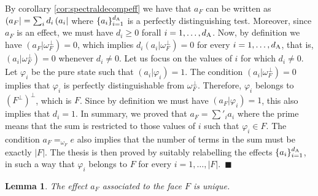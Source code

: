 \documentclass[12pt,aps,pra,showpacs,groupedaddress]{revtex4-1}
\newtheorem{lemma}{Lemma} \newtheorem{proposition}{Proposition}
\def\Proof{\medskip\par\noindent{\bf Proof. }}
\def\qed{$\,\blacksquare$\par}
\def\SC#1#2{\left(#1\right|\left.\!#2\right)}  \def\Tr{{\rm Tr}}
\begin{document}
\Proof By corollary \ref{cor:spectraldecompeff} we have that $a_F$ can
be written as $\left(a_F\right| = \sum_i d_i \left( a_i\right|$ where
$\{a_i\}_{i=1}^{d_{\rm A}}$ is a perfectly distinguishing test.  Moreover,
since $a_F$ is an effect, we must have $d_i\ge 0 $ forall $i=1, \dots,
d_{\rm A}$.  Now, by definition we have $\SC {a_F}{\omega_F^\perp} =0$,
which implies $d_i \SC {a_i} {\omega_F^\perp} = 0$ for every $i=1,
\dots, d_{\rm A}$, that is, $\SC {a_i}{\omega_F^\perp} = 0$ whenever $d_i
\not = 0$.  Let us focus on the values of $i$ for which $d_i \not =
0$. Let $\varphi_i$ be the pure state such that $\SC {a_i}{\varphi_i}
= 1$.  The condition $\SC {a_i}{\omega_F^\perp} = 0$ implies that
$\varphi_i$ is perfectly distinguishable from $\omega_F^\perp$.
Therefore, $\varphi_i$ belongs to $(F^\perp)^\perp$, which is $F$.
Since by definition we must have $\SC {a_F}{\varphi_i} = 1$, this also
implies that $d_i = 1$.  In summary, we proved that $a_F = \sum'_i
a_i$ where the prime means that the sum is restricted to those values
of $i$ such that $\varphi_i \in F$.  The condition $a_F =_{\omega_F}
e$ also implies that the number of terms in the sum must be exactly
$|F|$.  The thesis is then proved by suitably relabelling the effects
$\{a_i\}_{i=1}^{d_{\rm A}}$, in such a way that $\varphi_i $ belongs to
$F$ for every $i=1, \dots, |F|$.  \qed


\begin{lemma}\label{lem:uniqueaF}
  The effect $a_F$ associated to the face $F$ is unique.
\end{lemma}
\end{document}
